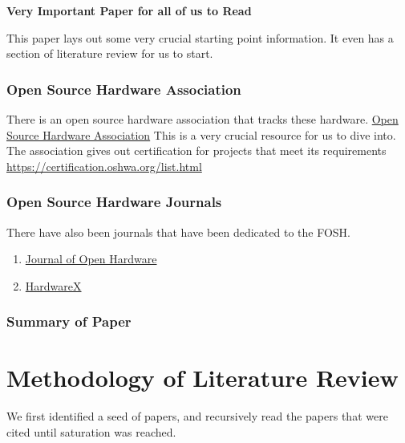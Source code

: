 \documentclass{article}
\begin{document}
\textbf{Very Important Paper for all of us to Read}

This paper lays out some very crucial starting point information.
It even has a section of literature review for us to start.

\subsubsection{Open Source Hardware Association}
There is an open source hardware association that tracks these hardware.
\href{https://www.oshwa.org}{Open Source Hardware Association}
This is a very crucial resource for us to dive into. 
The association gives out certification for projects that meet its requirements
\href{https://certification.oshwa.org/list.html}{https://certification.oshwa.org/list.html}

\subsubsection{Open Source Hardware Journals}
There have also been journals that have been dedicated to the FOSH.
\begin{enumerate}
    \item \href{https://openhardware.metajnl.com/}{Journal of Open Hardware}
    \item \href{https://www.sciencedirect.com/journal/hardwarex}{HardwareX}
\end{enumerate}

\subsubsection{Summary of Paper}

\section{Methodology of Literature Review}
We first identified a seed of papers, and recursively read the papers that were cited until saturation was reached. 

\nocite{*}
\printbibliography
\end{document}
